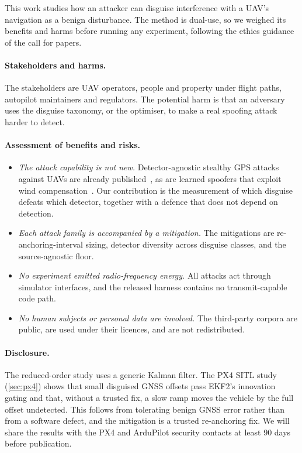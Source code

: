 This work studies how an attacker can disguise interference with a UAV's
navigation as a benign disturbance. The method is dual-use, so we weighed its
benefits and harms before running any experiment, following the ethics guidance of the call for
papers.

\paragraph{Stakeholders and harms.} The stakeholders are UAV operators, people
and property under flight paths, autopilot maintainers and regulators. The
potential harm is that an adversary uses the disguise taxonomy, or the
optimiser, to make a real spoofing attack harder to detect.

\paragraph{Assessment of benefits and risks.}
\begin{itemize}
\item \emph{The attack capability is not new.} Detector-agnostic stealthy GPS
  attacks against UAVs are already published~\cite{khazraei2024}, as are learned
  spoofers that exploit wind compensation~\cite{kim2024predictable}. Our
  contribution is the measurement of which disguise defeats which detector,
  together with a defence that does not depend on detection.
\item \emph{Each attack family is accompanied by a mitigation.} The mitigations are re-anchoring-interval sizing, detector
  diversity across disguise classes, and the source-agnostic floor.
\item \emph{No experiment emitted radio-frequency energy.} All attacks act
  through simulator interfaces, and the released harness contains no
  transmit-capable code path.
\item \emph{No human subjects or personal data are involved.} The third-party
  corpora are public, are used under their licences, and are not
  redistributed.
\end{itemize}

\paragraph{Disclosure.} The reduced-order study uses a generic Kalman filter.
The PX4 SITL study (\cref{sec:px4}) shows that small disguised GNSS offsets pass
EKF2's innovation gating and that, without a trusted fix, a slow ramp moves the
vehicle by the full offset undetected. This follows from tolerating benign GNSS
error rather than from a software defect, and the mitigation is a trusted
re-anchoring fix. We will share the results with the PX4 and ArduPilot security
contacts at least 90 days before publication.
